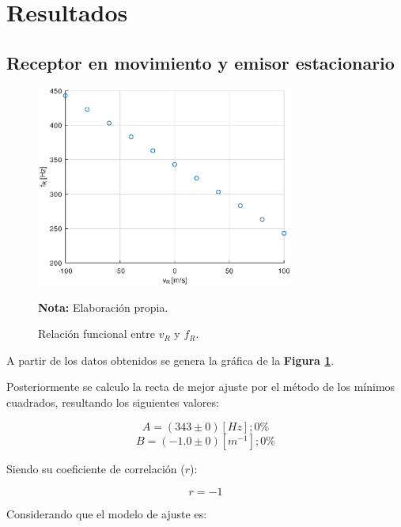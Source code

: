 \documentclass[letter,11pt]{article}
\newcommand{\source}[1]{\vspace{-11pt} \caption*{\small{\textbf{Nota:} {#1}}}}
\begin{document}
\section{Resultados}

\subsection{Receptor en movimiento y emisor estacionario}

\begin{figure}
\centering
\includegraphics[width=0.75\textwidth]{resources/o1.eps}
\caption{Relación funcional entre $v_R$ y $f_R$.}
\label{figura5}
\source{Elaboración propia.}
\end{figure}

A partir de los datos obtenidos se genera la gráfica de la
\textbf{Figura \ref{figura5}}.

Posteriormente se calculo la recta de mejor ajuste por el método de los mínimos
cuadrados, resultando los siguientes valores:

\begin{equation*}
    A = (343 \pm 0) [Hz]; 0\%
\end{equation*}
\begin{equation*}
    B = (-1.0 \pm 0) [m^{-1}]; 0\%
\end{equation*}
\vspace{0.10cm}

Siendo su coeficiente de correlación ($r$):

\begin{equation*}
    r = -1
\end{equation*}
\vspace{0.10cm}

Considerando que el modelo de ajuste es:
\end{document}
